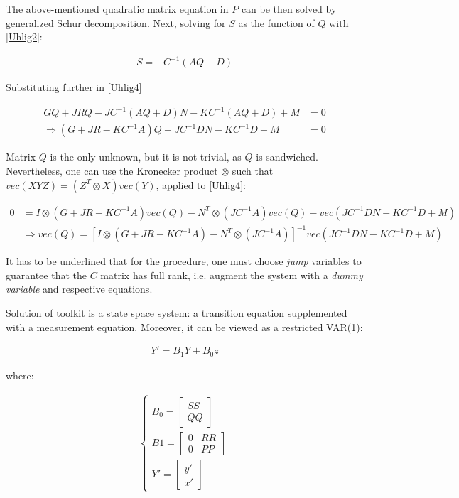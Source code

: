 \documentclass{pracamgr}
\numberwithin{equation}{section}
\begin{document}
The above-mentioned quadratic matrix equation in $P$ can be then solved by generalized Schur decomposition. Next, solving for $S$ as the function of $Q$ with \ref{Uhlig2}:

\begin{align}
S = -C^{-1} \left(AQ + D \right)
\end{align}

Substituting further in \ref{Uhlig4}

\begin{align}
GQ+JRQ-JC^{-1} (AQ+D)N - KC^{-1} (AQ+D)+M &= 0 \nonumber \\
\Rightarrow \left(G + JR - KC^{-1}A \right)Q - JC^{-1}DN - KC^{-1}D + M &= 0
\end{align}

Matrix $Q$ is the only unknown, but it is not trivial, as $Q$ is sandwiched. Nevertheless, one can use the Kronecker product $\otimes$ such that $vec \left(XYZ\right) = \left(Z^{T} \otimes X \right) vec(Y)$, applied to \ref{Uhlig4}:

\begin{align}
0 &= I \otimes \left(G + JR - KC^{-1}A \right) vec(Q) - N^{T} \otimes \left(JC^{-1}A\right) vec(Q) - vec\left(JC^{-1}DN - KC^{-1}D + M \right) \nonumber \\
& \Rightarrow vec(Q) = \left[ I \otimes \left(G + JR - KC^{-1}A \right) - N^{T} \otimes \left(JC^{-1}A \right)\right]^{-1} vec\left(JC^{-1}DN - KC^{-1}D + M \right)
\end{align}

It has to be underlined that for the \citet{uhlig1998toolkit} procedure, one must choose \textit{jump} variables to guarantee that the $C$ matrix has full rank, i.e. augment the system with a \textit{dummy variable} and respective equations.

Solution of \citet{uhlig1998toolkit} toolkit is a state space system: a transition equation supplemented with a measurement equation. Moreover, it can be viewed as a restricted VAR(1):

\begin{align}
Y' = B_{1}Y+ B_{0}z
\end{align}

where:

\begin{align}
\left\{
\begin{array}{cl}
B_{0} = \begin{bmatrix}
    SS \\
    QQ
\end{bmatrix} \\
B1 =  \begin{bmatrix}
    0 & RR \\
    0 & PP
\end{bmatrix} \\
Y' = \begin{bmatrix}
    y' \\
    x'
\end{bmatrix}
\end{array}
\right.
\end{align}
\end{document}
